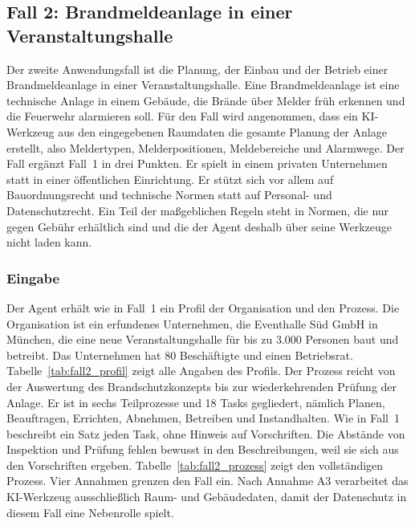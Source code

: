 \subsection{Fall 2: Brandmeldeanlage in einer Veranstaltungshalle}\label{sec:fall2}
Der zweite Anwendungsfall ist die Planung, der Einbau und der Betrieb einer Brandmeldeanlage in einer Veranstaltungshalle.
Eine Brandmeldeanlage ist eine technische Anlage in einem Gebäude, die Brände über Melder früh erkennen und die Feuerwehr alarmieren soll.
Für den Fall wird angenommen, dass ein KI-Werkzeug aus den eingegebenen Raumdaten die gesamte Planung der Anlage erstellt, also Meldertypen, Melderpositionen, Meldebereiche und Alarmwege.
Der Fall ergänzt Fall~1 in drei Punkten.
Er spielt in einem privaten Unternehmen statt in einer öffentlichen Einrichtung.
Er stützt sich vor allem auf Bauordnungsrecht und technische Normen statt auf Personal- und Datenschutzrecht.
Ein Teil der maßgeblichen Regeln steht in Normen, die nur gegen Gebühr erhältlich sind und die der Agent deshalb über seine Werkzeuge nicht laden kann.

\subsubsection{Eingabe}\label{sec:fall2_eingabe}
Der Agent erhält wie in Fall~1 ein Profil der Organisation und den Prozess.
Die Organisation ist ein erfundenes Unternehmen, die Eventhalle Süd GmbH in München, die eine neue Veranstaltungshalle für bis zu 3.000 Personen baut und betreibt.
Das Unternehmen hat 80 Beschäftigte und einen Betriebsrat.
Tabelle~\ref{tab:fall2_profil} zeigt alle Angaben des Profils.
Der Prozess reicht von der Auswertung des Brandschutzkonzepts bis zur wiederkehrenden Prüfung der Anlage.
Er ist in sechs Teilprozesse und 18 Tasks gegliedert, nämlich Planen, Beauftragen, Errichten, Abnehmen, Betreiben und Instandhalten.
Wie in Fall~1 beschreibt ein Satz jeden Task, ohne Hinweis auf Vorschriften.
Die Abstände von Inspektion und Prüfung fehlen bewusst in den Beschreibungen, weil sie sich aus den Vorschriften ergeben.
Tabelle~\ref{tab:fall2_prozess} zeigt den vollständigen Prozess.
Vier Annahmen grenzen den Fall ein.
Nach Annahme A3 verarbeitet das KI-Werkzeug ausschließlich Raum- und Gebäudedaten, damit der Datenschutz in diesem Fall eine Nebenrolle spielt.

